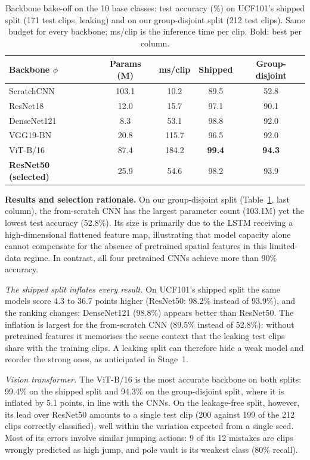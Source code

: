 \documentclass[conference]{IEEEtran}
\begin{document}
\begin{table}[t]
\centering
\caption{Backbone bake-off on the 10 base classes: test accuracy (\%) on UCF101's shipped split
(171 test clips, leaking) and on our group-disjoint split (212 test clips). Same budget for
every backbone; ms/clip is the inference time per clip. Bold: best per column.}
\label{tab:backbone}
\renewcommand{\arraystretch}{1.1}
\setlength{\tabcolsep}{3.5pt}
\begin{tabular}{lcccc}
\toprule
Backbone $\phi$ & Params (M) & ms/clip & Shipped & Group-disjoint \\
\midrule
ScratchCNN        & 103.1 & 10.2  & 89.5 & 52.8 \\
ResNet18          & 12.0  & 15.7  & 97.1 & 90.1 \\
DenseNet121       & 8.3   & 53.1  & 98.8 & 92.0 \\
VGG19-BN          & 20.8  & 115.7 & 96.5 & 92.0 \\
ViT-B/16          & 87.4  & 184.2 & \textbf{99.4} & \textbf{94.3} \\
\textbf{ResNet50 (selected)} & 25.9 & 54.6 & 98.2 & 93.9 \\
\bottomrule
\end{tabular}
\end{table}

\textbf{Results and selection rationale.} On our group-disjoint split (Table~\ref{tab:backbone},
last column), the from-scratch CNN has the largest parameter count (103.1M) yet the lowest test accuracy
(52.8\%). Its size is primarily due to the LSTM receiving a high-dimensional flattened
feature map, illustrating that model capacity alone cannot compensate for the absence of
pretrained spatial features in this limited-data regime. In contrast, all four pretrained
CNNs achieve more than 90\% accuracy.

\emph{The shipped split inflates every result.} On UCF101's shipped split the same models score
4.3 to 36.7 points higher (ResNet50: 98.2\% instead of 93.9\%), and the ranking changes:
DenseNet121 (98.8\%) appears better than ResNet50. The inflation is largest for the
from-scratch CNN (89.5\% instead of 52.8\%): without pretrained features it memorises the scene
context that the leaking test clips share with the training clips. A leaking split can therefore
hide a weak model and reorder the strong ones, as anticipated in Stage~1.

\emph{Vision transformer.} The ViT-B/16 is the most accurate backbone on both splits: 99.4\% on
the shipped split and 94.3\% on the group-disjoint split, where it is inflated by 5.1 points, in line
with the CNNs. On the leakage-free split, however, its lead over ResNet50 amounts to a single test clip
(200 against 199 of the 212 clips correctly classified), well within the variation expected from a
single seed. Most of its errors involve similar jumping actions: 9 of its 12 mistakes are clips
wrongly predicted as high jump, and pole vault is its weakest class (80\% recall).
\end{document}

